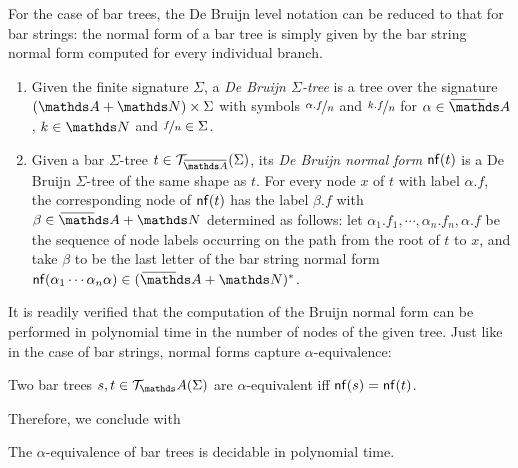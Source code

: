 \documentclass[a4paper,UKenglish,cleveref,autoref,thm-restate,numberwithinsect,final]{lipics-v2021}
\begin{document}
     For the case of bar trees, the De Bruijn
    level notation can be reduced to that for bar strings: the normal form of a bar tree is simply given by the bar string normal form
computed for every individual branch.
    \begin{defn}
        \begin{enumerate}
            \item Given the finite signature $\Sigma$, a \emph{De Bruijn $\Sigma$-tree} is a tree over the signature $(\At+\N)\times \Sigma$ with symbols $\nicefrac{\alpha.f}{n}$ and $\nicefrac{k.f}{n}$ for $\alpha\in\barNames$, $k\in \Nat$ and $\nicefrac{f}{n}\in \Sigma$. 
            \item Given a bar $\Sigma$-tree $t \in \bartree(\Sigma)$, its \emph{De Bruijn normal form} $\mathsf{nf}(t)$
                is a De Bruijn $\Sigma$-tree of the same shape as $t$. For every node $x$ of $t$ with label $\alpha.f$, the corresponding node of $\mathsf{nf}(t)$ has the label $\beta.f$ with $\beta\in \barNames+\N$ determined as follows: let $\alpha_1.f_1,\cdots,\alpha_n.f_n,\alpha.f$ be the sequence of node labels occurring on the path from the root of $t$ to $x$, and take $\beta$ to be the last letter of the bar string normal form $\nf(\alpha_1\cdots \alpha_n\alpha)\in (\barNames+\N)^*$.
        \end{enumerate}
    \end{defn}

    It is readily verified that the computation of the Bruijn normal form can be performed in
    polynomial time in the number of nodes of the given tree. Just like in the case of bar strings, normal forms capture $\alpha$-equivalence:


  

    \begin{proposition}\label{lem:aeTrees}
        Two bar trees $s, t \in \tree_\names(\Sigma)$ are $\alpha$-equivalent iff $\mathsf{nf}(s) = \mathsf{nf}(t)$.
    \end{proposition}
Therefore, we conclude with
\begin{corollary}\label{cor:alphaeq-decidable-finite-bar-trees}
The $\alpha$-equivalence of bar trees is decidable in polynomial time.
\end{corollary}
\end{document}
